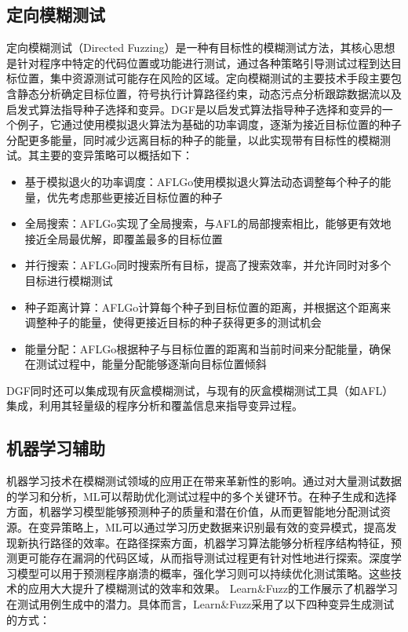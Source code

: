 \documentclass[10.5pt,compsoc]{CjC}
\theoremstyle{mystyle}
\begin{document}
\subsection{定向模糊测试}

定向模糊测试（Directed Fuzzing）是一种有目标性的模糊测试方法，其核心思想是针对程序中特定的代码位置或功能进行测试，通过各种策略引导测试过程到达目标位置，集中资源测试可能存在风险的区域。定向模糊测试的主要技术手段主要包含静态分析确定目标位置，符号执行计算路径约束，动态污点分析跟踪数据流以及启发式算法指导种子选择和变异。DGF是以启发式算法指导种子选择和变异的一个例子，它通过使用模拟退火算法为基础的功率调度，逐渐为接近目标位置的种子分配更多能量，同时减少远离目标的种子的能量，以此实现带有目标性的模糊测试。其主要的变异策略可以概括如下：
\begin{itemize}
\item 基于模拟退火的功率调度：AFLGo使用模拟退火算法动态调整每个种子的能量，优先考虑那些更接近目标位置的种子
\item 全局搜索：AFLGo实现了全局搜索，与AFL的局部搜索相比，能够更有效地接近全局最优解，即覆盖最多的目标位置
\item 并行搜索：AFLGo同时搜索所有目标，提高了搜索效率，并允许同时对多个目标进行模糊测试
\item 种子距离计算：AFLGo计算每个种子到目标位置的距离，并根据这个距离来调整种子的能量，使得更接近目标的种子获得更多的测试机会
\item 能量分配：AFLGo根据种子与目标位置的距离和当前时间来分配能量，确保在测试过程中，能量分配能够逐渐向目标位置倾斜
\end{itemize}

DGF同时还可以集成现有灰盒模糊测试，与现有的灰盒模糊测试工具（如AFL）集成，利用其轻量级的程序分析和覆盖信息来指导变异过程\cite{Böhme}。

\vspace {10mm}

\subsection{机器学习辅助}

机器学习技术在模糊测试领域的应用正在带来革新性的影响。通过对大量测试数据的学习和分析，ML可以帮助优化测试过程中的多个关键环节。在种子生成和选择方面，机器学习模型能够预测种子的质量和潜在价值，从而更智能地分配测试资源。在变异策略上，ML可以通过学习历史数据来识别最有效的变异模式，提高发现新执行路径的效率。在路径探索方面，机器学习算法能够分析程序结构特征，预测更可能存在漏洞的代码区域，从而指导测试过程更有针对性地进行探索。深度学习模型可以用于预测程序崩溃的概率，强化学习则可以持续优化测试策略。这些技术的应用大大提升了模糊测试的效率和效果。 Learn\&Fuzz的工作展示了机器学习在测试用例生成中的潜力。具体而言，Learn\&Fuzz采用了以下四种变异生成测试的方式\cite{Godefroid}：
\end{document}
